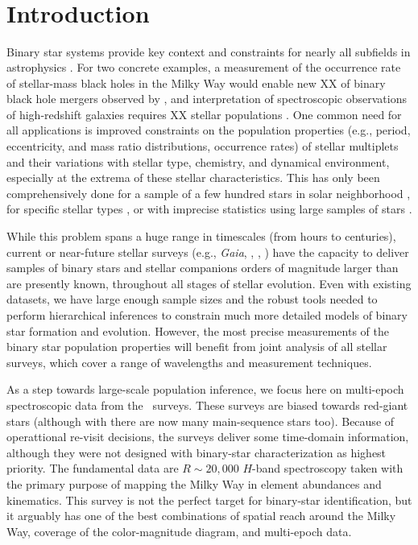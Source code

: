 \documentclass[modern]{aastex63}
\begin{document}
\keywords{}

\section*{~}\clearpage
\section{Introduction} \label{sec:intro}

Binary star systems provide key context and constraints for nearly all subfields
in astrophysics \citep[e.g.,][]{Breivik:BAAS, Rix:BAAS}.
For two concrete examples, a measurement of the occurrence rate of stellar-mass
black holes in the Milky Way would enable new XX of binary black hole mergers
observed by  \citep{LIGO:BH1, LIGO:catalog}, and interpretation of
spectroscopic observations of high-redshift galaxies requires XX stellar
populations \cite[e.g.,][]{Eldridge:2017}.
One common need for all applications is improved constraints on the population
properties (e.g., period, eccentricity, and mass ratio distributions, occurrence
rates) of stellar multiplets and their variations with stellar type, chemistry,
and dynamical environment, especially at the extrema of these stellar
characteristics.
This has only been comprehensively done for a sample of a few hundred stars in
solar neighborhood \citep{Raghavan:2010}, for specific stellar types
\citep[e.g.,][]{Moe:2017}, or with imprecise statistics using large samples of
stars \citep{Badenes:2018}.

While this problem spans a huge range in timescales (from hours to centuries),
current or near-future stellar surveys (e.g., \textit{Gaia}, \apogee,
, ) have the capacity to deliver samples of
binary stars and stellar companions orders of magnitude larger than are
presently known, throughout all stages of stellar evolution.
Even with existing datasets, we have large enough sample sizes and the robust
tools needed to perform hierarchical inferences to constrain much more detailed
models of binary star formation and evolution.
However, the most precise measurements of the binary star population properties
will benefit from joint analysis of all stellar surveys, which cover a range of
wavelengths and measurement techniques.

As a step towards large-scale population inference, we focus here on multi-epoch
spectroscopic data from the \apogee\ surveys.
These surveys are biased towards red-giant stars (although with  there are
now many main-sequence stars too).
Because of operattional re-visit decisions, the surveys deliver some
time-domain information, although they were not designed with
binary-star characterization as highest priority.
The fundamental data are $R\sim 20,000$ $H$-band spectroscopy taken with the
primary purpose of mapping the Milky Way in element abundances and kinematics.
This survey is not the perfect target for binary-star identification, but it
arguably has one of the best combinations of spatial reach around the Milky Way,
coverage of the color-magnitude diagram, and multi-epoch data.
\end{document}
